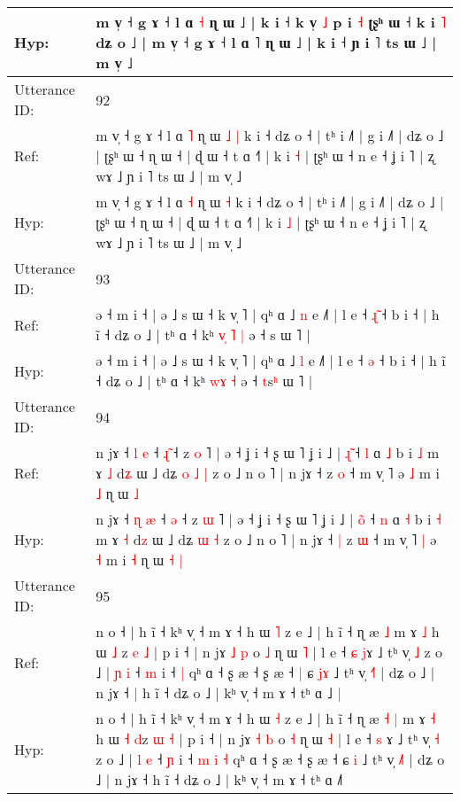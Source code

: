 \documentclass[10pt]{article}
\DeclareRobustCommand{\hl}[1]{{\textcolor{red}{#1}}}
\begin{document}
\begin{longtable}{ll}
Hyp: & m v̩ ˧ g ɤ ˧ l ɑ \hl{˧} ɳ ɯ ˩ | k i ˧ k v̩ \hl{˩} p i\hl{}\hl{} \hl{˧} ʈʂʰ ɯ ˧ k i \hl{˥} dʑ o ˩ | m v̩ ˧ g ɤ ˧ l ɑ ˥ ɳ ɯ ˩ | k i ˧ ɲ i ˥ ts ɯ ˩ | m v̩ ˩
 \\
\midrule
Utterance ID: & 92 \\
Ref: & m v̩ ˧ g ɤ ˧ l ɑ \hl{˥} ɳ ɯ\hl{ }\hl{˩} \hl{|} k i ˧ dʑ o ˧ | tʰ i ˩˥ | g i ˩˥ | dʑ o ˩ | ʈʂʰ ɯ ˧ ɳ ɯ ˧ | ɖ ɯ ˧ t ɑ ˧˥ | k i \hl{˧} | ʈʂʰ ɯ ˧ n e ˧ ʝ i ˥ | ʐ wɤ ˩ ɲ i ˥ ts ɯ ˩ | m v̩ ˩
 \\
Hyp: & m v̩ ˧ g ɤ ˧ l ɑ \hl{˧} ɳ ɯ\hl{}\hl{} \hl{˧} k i ˧ dʑ o ˧ | tʰ i ˩˥ | g i ˩˥ | dʑ o ˩ | ʈʂʰ ɯ ˧ ɳ ɯ ˧ | ɖ ɯ ˧ t ɑ ˧˥ | k i \hl{˩} | ʈʂʰ ɯ ˧ n e ˧ ʝ i ˥ | ʐ wɤ ˩ ɲ i ˥ ts ɯ ˩ | m v̩ ˩
 \\
\midrule
Utterance ID: & 93 \\
Ref: & ə ˧ m i ˧ | ə ˩ s ɯ ˧ k v̩ ˥ | qʰ ɑ ˩ \hl{n} e ˩˥ | l e ˧ \hl{ɻ}\hl{̃} ˧ b i ˧ | h ĩ ˧ dʑ o ˩ | tʰ ɑ ˧ kʰ \hl{v}\hl{̩}\hl{ }\hl{˥} \hl{|} ə ˧ \hl{}s\hl{} ɯ ˥ |
 \\
Hyp: & ə ˧ m i ˧ | ə ˩ s ɯ ˧ k v̩ ˥ | qʰ ɑ ˩ \hl{l} e ˩˥ | l e ˧ \hl{}\hl{ə} ˧ b i ˧ | h ĩ ˧ dʑ o ˩ | tʰ ɑ ˧ kʰ \hl{}\hl{}\hl{w}\hl{ɤ} \hl{˧} ə ˧ \hl{t}s\hl{ʰ} ɯ ˥ |
 \\
\midrule
Utterance ID: & 94 \\
Ref: & n jɤ ˧ \hl{l} \hl{e} ˧ \hl{ɻ}\hl{̃} ˧ z \hl{o} ˥ | ə ˧ ʝ i ˧ ʂ ɯ ˥ ʝ i ˩ | \hl{ɻ}̃ ˧ \hl{l} ɑ \hl{˩} b i \hl{˩} m ɤ \hl{˩} d\hl{ʑ} ɯ ˩ dʑ\hl{ }\hl{o} \hl{˩} \hl{|} z o ˩ n o ˥ | n jɤ ˧\hl{}\hl{} z \hl{o} ˧ m v̩ ˥\hl{}\hl{} ə \hl{˩} m i \hl{˩} ɳ ɯ\hl{}\hl{} \hl{˩}
 \\
Hyp: & n jɤ ˧ \hl{ɳ} \hl{æ} ˧ \hl{}\hl{ə} ˧ z \hl{ɯ} ˥ | ə ˧ ʝ i ˧ ʂ ɯ ˥ ʝ i ˩ | \hl{o}̃ ˧ \hl{n} ɑ \hl{˧} b i \hl{˧} m ɤ \hl{˧} d\hl{z} ɯ ˩ dʑ\hl{}\hl{} \hl{ɯ} \hl{˧} z o ˩ n o ˥ | n jɤ ˧\hl{ }\hl{|} z \hl{ɯ} ˧ m v̩ ˥\hl{ }\hl{|} ə \hl{˧} m i \hl{˧} ɳ ɯ\hl{ }\hl{˧} \hl{|}
 \\
\midrule
Utterance ID: & 95 \\
Ref: & n o ˧ | h ĩ ˧ kʰ v̩ ˧ m ɤ ˧ h ɯ \hl{˥} z e ˩ | h ĩ ˧ ɳ æ\hl{}\hl{} \hl{˩} m ɤ \hl{˩} h ɯ \hl{˩} \hl{}z \hl{e} \hl{˩} | p i ˧ | n jɤ \hl{˩} \hl{p} o \hl{˩} ɳ ɯ \hl{˥} | l e ˧ \hl{ɕ} \hl{j}ɤ ˩ tʰ v̩ \hl{˩} z o ˩ | \hl{ɲ} \hl{i} ˧ \hl{m} i ˧\hl{}\hl{}\hl{}\hl{} \hl{|} qʰ ɑ ˧ ʂ æ ˧ ʂ æ ˧\hl{ }\hl{|} ɕ \hl{j}\hl{ɤ} ˩ tʰ v̩ \hl{˧}˥ | dʑ o ˩ | n jɤ ˧\hl{ }\hl{|} h ĩ ˧ dʑ o ˩ | kʰ v̩ ˧ m ɤ ˧ tʰ ɑ ˩\hl{ }\hl{|}
 \\
Hyp: & n o ˧ | h ĩ ˧ kʰ v̩ ˧ m ɤ ˧ h ɯ \hl{˧} z e ˩ | h ĩ ˧ ɳ æ\hl{ }\hl{˧} \hl{|} m ɤ \hl{˧} h ɯ \hl{˧} \hl{d}z \hl{ɯ} \hl{˧} | p i ˧ | n jɤ \hl{˧} \hl{b} o \hl{˧} ɳ ɯ \hl{˧} | l e ˧ \hl{s} \hl{}ɤ ˩ tʰ v̩ \hl{˧} z o ˩ | \hl{l} \hl{e} ˧ \hl{ɲ} i ˧\hl{ }\hl{m}\hl{ }\hl{i} \hl{˧} qʰ ɑ ˧ ʂ æ ˧ ʂ æ ˧\hl{}\hl{} ɕ \hl{}\hl{i} ˩ tʰ v̩ \hl{˩}˥ | dʑ o ˩ | n jɤ ˧\hl{}\hl{} h ĩ ˧ dʑ o ˩ | kʰ v̩ ˧ m ɤ ˧ tʰ ɑ ˩\hl{}\hl{˥}

\end{longtable}
\end{document}

